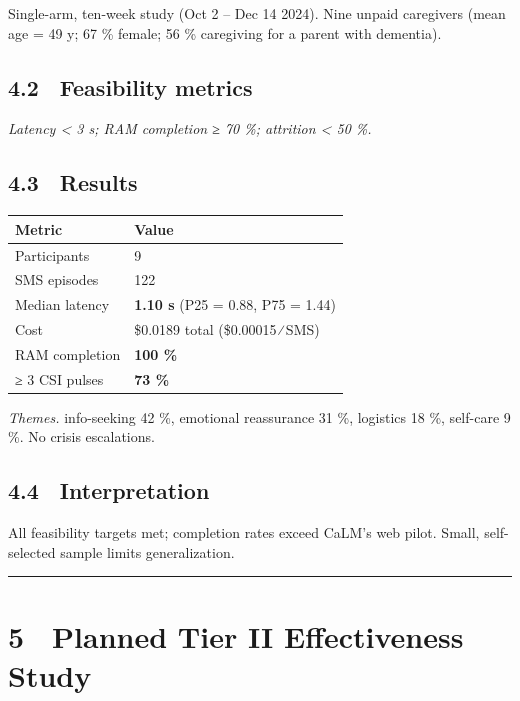 \documentclass[
]{article}
\begin{document}
Single-arm, ten-week study (Oct 2 -- Dec 14 2024). Nine unpaid
caregivers (mean age = 49 y; 67 \% female; 56 \% caregiving for a parent
with dementia).

\subsection{4.2 Feasibility metrics}\label{feasibility-metrics}

\emph{Latency \textless{} 3 s; RAM completion ≥ 70 \%; attrition
\textless{} 50 \%.}

\subsection{4.3 Results}\label{results}

\begin{longtable}[]{@{}ll@{}}
\toprule\noalign{}
Metric & Value \\
\midrule\noalign{}
\endhead
\bottomrule\noalign{}
\endlastfoot
Participants & 9 \\
SMS episodes & 122 \\
Median latency & \textbf{1.10 s} (P25 = 0.88, P75 = 1.44) \\
Cost & \$0.0189 total (\$0.00015 ∕ SMS) \\
RAM completion & \textbf{100 \%} \\
≥ 3 CSI pulses & \textbf{73 \%} \\
\end{longtable}

\emph{Themes.} info-seeking 42 \%, emotional reassurance 31 \%,
logistics 18 \%, self-care 9 \%. No crisis escalations.

\subsection{4.4 Interpretation}\label{interpretation}

All feasibility targets met; completion rates exceed CaLM's web pilot.
Small, self-selected sample limits generalization.

\begin{center}\rule{0.5\linewidth}{0.5pt}\end{center}

\section{5 Planned Tier II Effectiveness
Study}\label{planned-tier-ii-effectiveness-study}
\end{document}
